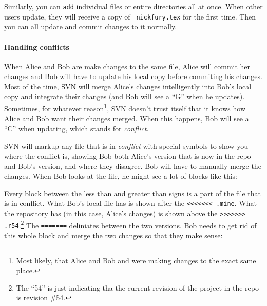 \documentclass[green]{testgame}
\begin{document}
Similarly, you can {\tt add} individual files or entire directories
all at once. When other users update, they will receive a copy of {\tt
nickfury.tex} for the first time. Then you can all update and commit
changes to it normally.


\paragraph*{Handling conflicts}

When Alice and Bob are make changes to the same file, Alice will
commit her changes and Bob will have to update his local copy before
commiting his changes. Most of the time, SVN will merge Alice's
changes intelligently into Bob's local copy and integrate their
changes (and Bob will see a ``G'' when he updates). Sometimes, for
whatever reason\footnote{Most likely, that Alice and Bob and were
making changes to the exact same place.}, SVN doesn't trust itself
that it knows how Alice and Bob want their changes merged. When this
happens, Bob will see a ``C'' when updating, which stands for {\em
conflict}.


SVN will markup any file that is in {\em conflict} with special
symbols to show you where the conflict is, showing Bob both Alice's
version that is now in the repo and Bob's version, and where they
disagree. Bob will have to manually merge the changes. When Bob looks
at the file, he might see a lot of blocks like this:


Every block between the less than and greater than signs is a part of
the file that is in conflict. What Bob's local file has is shown after
the {\tt <<<<<<< .mine}. What the repository has (in this case,
Alice's changes) is shown above the {\tt >>>>>>> .r54}.\footnote{The
``54'' is just indicating tha the current revision of the project in
the repo is revision \#54.} The {\tt =======} deliniates between the
two versions. Bob needs to get rid of this whole block and merge the
two changes so that they make sense:

\end{document}
